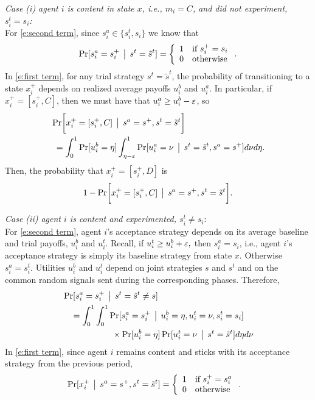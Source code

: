 \noindent\emph{Case (i) agent $i$ is content in state $x$, i.e., $m_i = C$, and did not experiment, $s_i^t = s_i$:}\\
\noindent For \eqref{e:second term}, since $s_i^a\in \{s_i^t,s_i\}$ we know that%
\begin{align*}
\operatorname{ Pr }[ s_i^a = s_i^+\,\bigm\vert\, s^t = \tilde{s}^t]
=\left\{
\begin{array}{ll}
1 &\text{if } s_i^+ = s_i\\
0 & \text{otherwise}
\end{array}
\right..
\end{align*}
In \eqref{e:first term}, for any trial strategy $s^t = \tilde{s}^t$, the probability of transitioning to a state $x_i^+$ depends on realized average payoffs $u_i^b$ and $u_i^a$. In particular, if $x_i^+  = [s_i^+,C]$, then we must have that $u_i^a\geq u_i^b - \varepsilon$, so
\begin{align*}
&\operatorname{ Pr }\biggl[x_i^+ = [s_i^+,C]\,\bigm\vert\, s^a = s^+, s^t = \tilde{s}^t\biggr]\\
&\hspace{.05in} = \int_0^1 \operatorname{ Pr }[u_i^b = \eta ] \int_{\eta-\varepsilon}^1 \operatorname{ Pr }[u_i^a = \nu \,\bigm\vert\, s^t = \tilde{s}^t, s^a = s^+] d\nu d\eta.
\end{align*}
Then, the probability that $x_i^+ = [s_i^+,D]$ is
$$1 - \operatorname{ Pr }\biggl[x_i^+ = [s_i^+,C]\,\bigm\vert\, s^a = s^+, s^t = \tilde{s}^t\biggr].$$

%
\noindent\emph{Case (ii) agent $i$ is content and experimented, $s_i^t\neq s_i:$}\\
\noindent For \eqref{e:second term}, agent $i$'s acceptance strategy depends on its average baseline and trial payoffs, $u_i^b$ and $u_i^t$. Recall, if $u_i^t\geq u_i^b+\varepsilon,$ then $s_i^a = s_i$, i.e., agent $i$'s acceptance strategy is simply its baseline strategy from state $x$. Otherwise $s_i^a = s_i^t.$
Utilities $u_i^b$ and $u_i^t$ depend on joint strategies $s$ and $s^t$ and on the common random signals sent during the corresponding phases. Therefore, 
% 
\begin{align*}
&\operatorname{ Pr }[ s_i^a = s_i^+\,\bigm\vert\, s^t = \tilde{s}^t\neq s]\nonumber\\
&\quad=\int_0^1\int_0^1 \operatorname{ Pr }[ s_i^a = s_i^+\,\bigm\vert\, u_i^b = \eta, u_i^t = \nu, s_i^t = s_i]\nonumber\\
&\hspace{.8in} \times \operatorname{ Pr }[u_i^b = \eta]\operatorname{ Pr }[u_i^t = \nu\,\bigm\vert\, s^t = \tilde{s}^t]d\eta d\nu
\end{align*}
In \eqref{e:first term}, since agent $i$ remains content and sticks with its acceptance strategy from the previous period,
{\allowdisplaybreaks[3]\begin{align*}
&\operatorname{ Pr }[x_i^+\,\bigm\vert\, s^a = s^+, s^t = \tilde{s}^t]= \left\{
\begin{array}{ll}
1 & \text{if }s_i^+ = s_i^a\\
0 & \text{otherwise}
\end{array}
\right..
\end{align*}}

